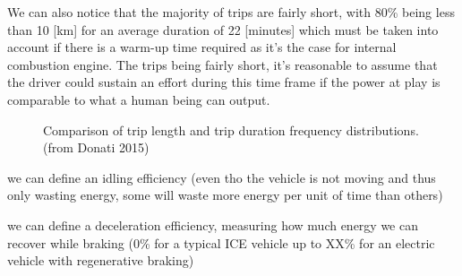 We can also notice that the majority of trips are fairly short, with 80\% being less than 10 [km] for an average duration of 22 [minutes] which must be taken into account if there is a warm-up time required as it's the case for internal combustion engine. The trips being fairly short, it's reasonable to assume that the driver could sustain an effort during this time frame if the power at play is comparable to what a human being can output.

\begin{figure}[h!]
    \centering
    \hfill
    \caption{Comparison of trip length and trip duration frequency distributions. (from Donati 2015\cite{donati_individual_2015})}
    \label{fig:trips-comparison}
\end{figure}

we can define an idling efficiency (even tho the vehicle is not moving and thus only wasting energy, some will waste more energy per unit of time than others)

we can define a deceleration efficiency, measuring how much energy we can recover while braking (0\% for a typical ICE vehicle up to XX\% for an electric vehicle with regenerative braking) 

